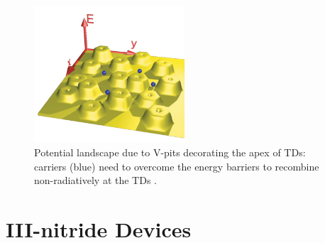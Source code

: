 \begin{figure}[h]
	\centering
	\includegraphics[width=0.5\textwidth]{Figs/Ch1/landscape.png}
	\caption {Potential landscape due to V-pits decorating the apex of TDs: carriers (blue) need to overcome the energy barriers to recombine non-radiatively at the TDs \cite{Hangleiter2005}.}
	\label{1.9}
\end{figure}
\FloatBarrier 

 
\section{III-nitride Devices } %
